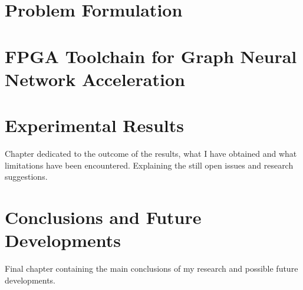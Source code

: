 \documentclass{Configuration_Files/PoliMi3i_thesis}
\begin{document}


    \chapter{Problem Formulation}
    \label{ch:chapter_four}%
    



    \chapter{FPGA Toolchain for Graph Neural Network Acceleration}
    \label{ch:chapter_five}%
    





    \chapter{Experimental Results}
    \label{ch:chapter_six}%

    Chapter dedicated to the outcome of the results, what I have obtained and what limitations have been encountered.
    Explaining the still open issues and research suggestions.




    \chapter{Conclusions and Future Developments}
    \label{ch:conclusions}%
    Final chapter containing the main conclusions of my research
    and possible future developments.

\end{document}
